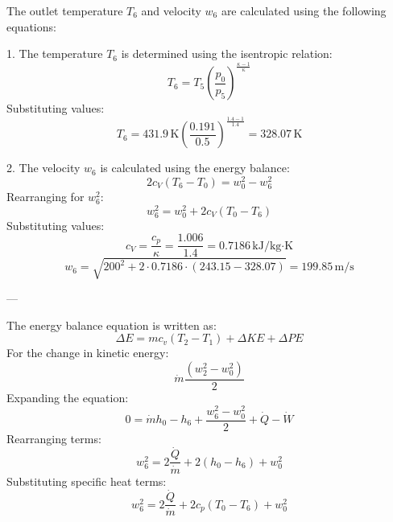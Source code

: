The outlet temperature \( T_6 \) and velocity \( w_6 \) are calculated using the following equations:  

1. The temperature \( T_6 \) is determined using the isentropic relation:  
\[
T_6 = T_5 \left( \frac{p_0}{p_5} \right)^{\frac{\kappa - 1}{\kappa}}
\]  
Substituting values:  
\[
T_6 = 431.9 \, \text{K} \left( \frac{0.191}{0.5} \right)^{\frac{1.4 - 1}{1.4}} = 328.07 \, \text{K}
\]

2. The velocity \( w_6 \) is calculated using the energy balance:  
\[
2c_V(T_6 - T_0) = w_0^2 - w_6^2
\]  
Rearranging for \( w_6^2 \):  
\[
w_6^2 = w_0^2 + 2c_V(T_0 - T_6)
\]  
Substituting values:  
\[
c_V = \frac{c_p}{\kappa} = \frac{1.006}{1.4} = 0.7186 \, \text{kJ/kg·K}
\]  
\[
w_6 = \sqrt{200^2 + 2 \cdot 0.7186 \cdot (243.15 - 328.07)} = 199.85 \, \text{m/s}
\]

---

The energy balance equation is written as:  
\[
\Delta E = m c_v (T_2 - T_1) + \Delta KE + \Delta PE
\]  
For the change in kinetic energy:  
\[
\dot{m} \frac{(w_2^2 - w_0^2)}{2}
\]  
Expanding the equation:  
\[
0 = \dot{m} h_0 - h_6 + \frac{w_6^2 - w_0^2}{2} + \dot{Q} - \dot{W}
\]  
Rearranging terms:  
\[
w_6^2 = 2 \frac{\dot{Q}}{\dot{m}} + 2 (h_0 - h_6) + w_0^2
\]  
Substituting specific heat terms:  
\[
w_6^2 = 2 \frac{\dot{Q}}{\dot{m}} + 2 c_p (T_0 - T_6) + w_0^2
\]